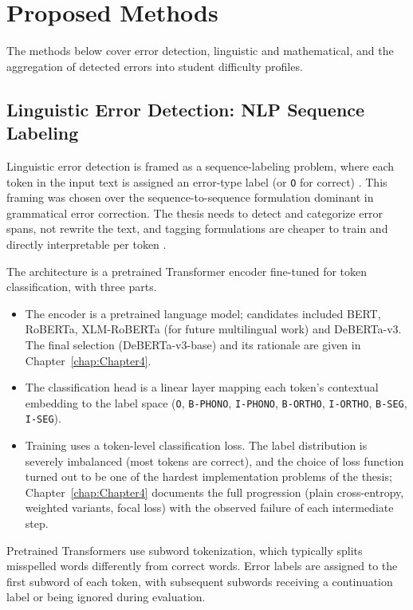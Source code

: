 \section{Proposed Methods}
\label{sec:method_models}

The methods below cover error detection, linguistic and mathematical, and the aggregation of detected errors into student difficulty profiles.

\subsection{Linguistic Error Detection: NLP Sequence Labeling}
\label{sec:method_models_ling}

Linguistic error detection is framed as a sequence-labeling problem, where each token in the input text is assigned an error-type label (or \texttt{O} for correct) \parencite{MaHovy2016,ReiYannakoudakis2016}. This framing was chosen over the sequence-to-sequence formulation dominant in grammatical error correction. The thesis needs to detect and categorize error spans, not rewrite the text, and tagging formulations are cheaper to train and directly interpretable per token \parencite{Omelianchuk2020GECToR}.

The architecture is a pretrained Transformer encoder fine-tuned for token classification, with three parts.
\begin{itemize}
    \item The encoder is a pretrained language model; candidates included BERT, RoBERTa, XLM-RoBERTa (for future multilingual work) and DeBERTa-v3. The final selection (DeBERTa-v3-base) and its rationale are given in Chapter~\ref{chap:Chapter4}.
    \item The classification head is a linear layer mapping each token's contextual embedding to the label space (\texttt{O}, \texttt{B-PHONO}, \texttt{I-PHONO}, \texttt{B-ORTHO}, \texttt{I-ORTHO}, \texttt{B-SEG}, \texttt{I-SEG}).
    \item Training uses a token-level classification loss. The label distribution is severely imbalanced (most tokens are correct), and the choice of loss function turned out to be one of the hardest implementation problems of the thesis; Chapter~\ref{chap:Chapter4} documents the full progression (plain cross-entropy, weighted variants, focal loss) with the observed failure of each intermediate step.
\end{itemize}

Pretrained Transformers use subword tokenization, which typically splits misspelled words differently from correct words. Error labels are assigned to the first subword of each token, with subsequent subwords receiving a continuation label or being ignored during evaluation.

